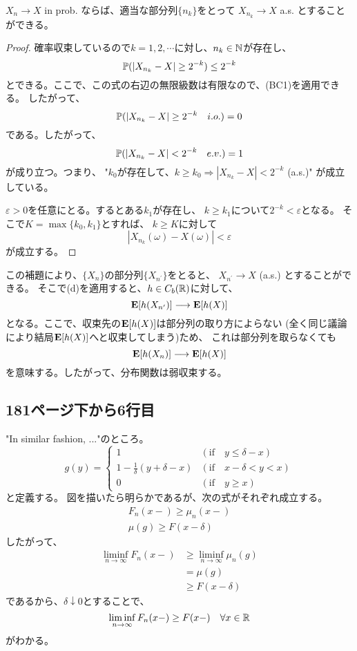     \begin{lem*}
      $X_n \longrightarrow X$ in prob. ならば、適当な部分列$\{n_k\}$をとって
      $X_{n_k} \longrightarrow X$ a.s. とすることができる。
    \end{lem*}
    \begin{proof}
      確率収束しているので$k =1,2,\cdots$に対し、$n_k \in {\mathbb{N}}$が存在し、
      \[
        {\mathbb{P}}(|X_{n_k} - X| \ge 2^{-k}) \leq 2^{-k}
      \]
      とできる。ここで、この式の右辺の無限級数は有限なので、(BC1)を適用できる。
      したがって、
      \[
        {\mathbb{P}}(|X_{n_k} - X| \ge 2^{-k} \quad i.o.) = 0
      \]
      である。したがって、
      \[
        {\mathbb{P}}(|X_{n_k} - X| < 2^{-k} \quad e.v.) = 1
      \]
      が成り立つ。つまり、
      "$k_0$が存在して、$k \ge k_0 \Rightarrow |X_{n_k} - X| < 2^{-k}$ (a.s.)"
      が成立している。

      $\varepsilon > 0$を任意にとる。するとある$k_1$が存在し、
      $k \ge k_1$について$2^{-k} < \varepsilon$となる。
      そこで$K = \max\{k_0,k_1\}$とすれば、
      $k \ge K$に対して
      \[
        |X_{n_k}(\omega) - X(\omega)| < \varepsilon
      \]
      が成立する。
    \end{proof}

    この補題により、$\{X_n\}$の部分列$\{X_{n^{\prime}}\}$をとると、
    $X_{n^{\prime}} \longrightarrow X$ (a.s.) とすることができる。
    そこで(d)を適用すると、$h \in C_b({\mathbb{R}})$に対して、
    \[
      {\mathbf{E}}[h(X_{n^{\prime}})] \longrightarrow {\mathbf{E}}[h(X)]
    \]
    となる。ここで、収束先の${\mathbf{E}}[h(X)]$は部分列の取り方によらない
    (全く同じ議論により結局${\mathbf{E}}[h(X)]$へと収束してしまう)ため、
    これは部分列を取らなくても
    \[
      {\mathbf{E}}[h(X_n)] \longrightarrow {\mathbf{E}}[h(X)]
    \]
    を意味する。したがって、分布関数は弱収束する。

  \subsection{181ページ下から6行目}
    "In similar fashion, ..."のところ。
    \[
      g(y) = \begin{cases}
        1 & (\text{if} \quad y \leq \delta - x)\\
        1 - \frac{1}{\delta}(y+\delta - x)  & (\text{if}\quad x -\delta < y < x)\\
        0 & (\text{if}\quad y \ge x)
    \end{cases}
    \]
    と定義する。
    図を描いたら明らかであるが、次の式がそれぞれ成立する。
    \begin{align*}
      F_n(x-) \ge \mu_n(x-)\\
      \mu(g) \ge F(x - \delta)
    \end{align*}
    したがって、
    \begin{align*}
      \liminf_{n \to \infty} F_n(x-) &\ge \liminf_{n \to \infty} \mu_n(g)\\
      &= \mu(g)\\
      &\ge F(x - \delta)
    \end{align*}
    であるから、$\delta \downarrow 0$とすることで、
    \[
      \liminf_{n \to \infty}F_n(x-) \ge F(x-) \quad \forall x \in {\mathbb{R}}
    \]
    がわかる。

